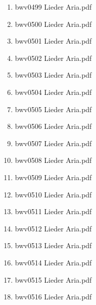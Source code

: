 \documentclass[11pt]{article}
\begin{document}
\begin{enumerate}
\begin{enumerate}
\begin{enumerate}
\item bwv0499   Lieder Aria.pdf
\label{sec-1-1-1-1-44-6-7-4-61}

\item bwv0500   Lieder Aria.pdf
\label{sec-1-1-1-1-44-6-7-4-62}

\item bwv0501   Lieder Aria.pdf
\label{sec-1-1-1-1-44-6-7-4-63}

\item bwv0502   Lieder Aria.pdf
\label{sec-1-1-1-1-44-6-7-4-64}

\item bwv0503   Lieder Aria.pdf
\label{sec-1-1-1-1-44-6-7-4-65}

\item bwv0504   Lieder Aria.pdf
\label{sec-1-1-1-1-44-6-7-4-66}

\item bwv0505   Lieder Aria.pdf
\label{sec-1-1-1-1-44-6-7-4-67}

\item bwv0506   Lieder Aria.pdf
\label{sec-1-1-1-1-44-6-7-4-68}

\item bwv0507   Lieder Aria.pdf
\label{sec-1-1-1-1-44-6-7-4-69}

\item bwv0508   Lieder Aria.pdf
\label{sec-1-1-1-1-44-6-7-4-70}

\item bwv0509   Lieder Aria.pdf
\label{sec-1-1-1-1-44-6-7-4-71}

\item bwv0510   Lieder Aria.pdf
\label{sec-1-1-1-1-44-6-7-4-72}

\item bwv0511   Lieder Aria.pdf
\label{sec-1-1-1-1-44-6-7-4-73}

\item bwv0512   Lieder Aria.pdf
\label{sec-1-1-1-1-44-6-7-4-74}

\item bwv0513   Lieder Aria.pdf
\label{sec-1-1-1-1-44-6-7-4-75}

\item bwv0514   Lieder Aria.pdf
\label{sec-1-1-1-1-44-6-7-4-76}

\item bwv0515   Lieder Aria.pdf
\label{sec-1-1-1-1-44-6-7-4-77}

\item bwv0516   Lieder Aria.pdf
\label{sec-1-1-1-1-44-6-7-4-78}


\end{enumerate}
\end{enumerate}
\end{enumerate}
\end{document}
